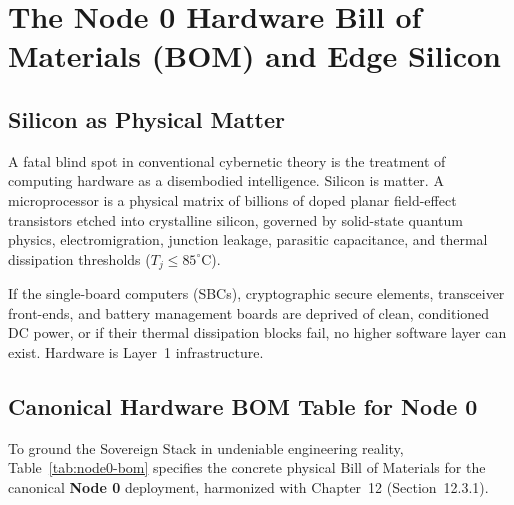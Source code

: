 \section{The Node 0 Hardware Bill of Materials (BOM) and Edge Silicon}
\label{sec:l1_bom}

\subsection{Silicon as Physical Matter}

A fatal blind spot in conventional cybernetic theory is the treatment of computing hardware as a disembodied intelligence. Silicon is matter. A microprocessor is a physical matrix of billions of doped planar field-effect transistors etched into crystalline silicon, governed by solid-state quantum physics, electromigration, junction leakage, parasitic capacitance, and thermal dissipation thresholds ($T_j \le 85^\circ\mathrm{C}$). 

If the single-board computers (SBCs), cryptographic secure elements, transceiver front-ends, and battery management boards are deprived of clean, conditioned DC power, or if their thermal dissipation blocks fail, no higher software layer can exist. Hardware is Layer~1 infrastructure.

\subsection{Canonical Hardware BOM Table for Node 0}

To ground the Sovereign Stack in undeniable engineering reality, Table~\ref{tab:node0-bom} specifies the concrete physical Bill of Materials for the canonical \textbf{Node 0} deployment, harmonized with Chapter~12 (Section~12.3.1).

